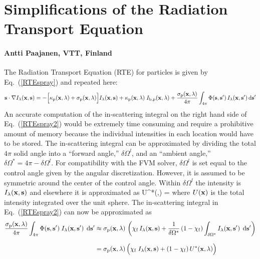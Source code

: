 \chapter{Simplifications of the Radiation Transport Equation}
\label{radiation_derivations}

\subsubsection*{Antti Paajanen, VTT, Finland}


The Radiation Transport Equation (RTE) for particles is given by Eq.~(\ref{RTEspray}) and repeated here:
\begin{equation}
\mathbf{s} \cdot \nabla I_{\lambda}(\mathbf{x},\mathbf{s}) = -\Big[ \kappa_{\rm p}(\mathbf{x},\lambda) + \sigma_{\rm p}(\mathbf{x},\lambda) \Big]
I_{\lambda}(\mathbf{x},\mathbf{s}) +\kappa_{\rm p}(\mathbf{x},\lambda) \; I_{{\rm b,p}}(\mathbf{x},\lambda) +
\frac{\sigma_{\rm p}(\mathbf{x},\lambda)}{4\pi}
\int_{4\pi}\Phi(\mathbf{s},\mathbf{s}') \, I_{\lambda}(\mathbf{x},\mathbf{s}') \, \rm d\mathbf{s}' \label{RTEspray2}
\end{equation}
An accurate computation of the in-scattering integral on the right hand side of Eq.~(\ref{RTEspray2}) would be extremely time consuming and require a prohibitive amount of memory because the individual intensities in each location would have to be stored. The in-scattering integral can be approximated by dividing the total $4\pi$ solid angle into a ``forward angle,'' $\delta\Omega^l$, and an ``ambient angle,'' $\delta\Omega^*=4\pi - \delta\Omega^l$.  For compatibility with the FVM solver, $\delta\Omega^l$ is set equal to the control angle given by the angular discretization.  However, it is assumed to be symmetric around the center of the control angle.  Within $\delta\Omega^l$ the intensity is $I_{\lambda}({\mathbf{x}},{\mathbf{s}})$ and elsewhere it is approximated as
\be
\label{Ustar}
U^*(\bx,\la) = 
\ee
where $U({\mathbf{x}})$ is the total intensity integrated over the unit sphere. The in-scattering integral in Eq.~(\ref{RTEspray2}) can now be approximated as
\begin{align}
\notag \frac{\sigma_{\rm p}({\mathbf{x}},\lambda)}{4\pi}\int_{4\pi}\Phi({\mathbf{s}},{\mathbf{s}}') \; I_{\lambda}({\mathbf{x}},{\mathbf{s}}')
  \; \,\mathrm{d}{\mathbf{s}}'
  &\approx
\sigma_{\rm p}({\mathbf{x}},\lambda) \, \left( \chi_{\rm f} \, I_{\lambda}({\mathbf{x}},{\mathbf{s}}) + \frac{1}{\delta\Omega^{*}} \left(1-\chi_{\rm f}\right)
\int_{\delta\Omega^{*}} I_{\lambda}({\mathbf{x}},{\mathbf{s}}') \; \,\mathrm{d} {\mathbf{s}}' \right)\\[0.1in]
  &=
\sigma_{\rm p}({\mathbf{x}},\lambda) \, \Big( \chi_{\rm f} \; I_{\lambda}({\mathbf{x}},{\mathbf{s}}) +
(1-\chi_{\rm f}) \, U^*({\mathbf{x}},\lambda) \Big)
\label{SprayRTE_RHS}
\end{align}
